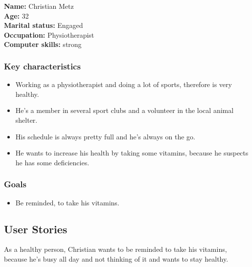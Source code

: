 \documentclass[12pt, a4paper, ngerman]{article}
\begin{document}
\textbf{Name:} Christian Metz \\
\textbf{Age:} 32 \\
\textbf{Marital status:} Engaged \\
\textbf{Occupation:} Physiotherapist \\
\textbf{Computer skills:} strong
\subsubsection*{Key characteristics}

\begin{itemize}[noitemsep]
	\item Working as a physiotherapist and doing a lot of sports, therefore is very healthy.
	\item He's a member in several sport clubs and a volunteer in the local animal shelter.
	\item His schedule is always pretty full and he's always on the go.
	\item He wants to increase his health by taking some vitamins, because he suspects he has some deficiencies.
\end{itemize}

\subsubsection*{Goals}

\begin{itemize}[noitemsep]
	\item Be reminded, to take his vitamins.
\end{itemize}


\subsection*{User Stories}

As a healthy person, Christian wants to be reminded to take his vitamins, because he's busy all day and not thinking of it and wants to stay healthy.
\end{document}
